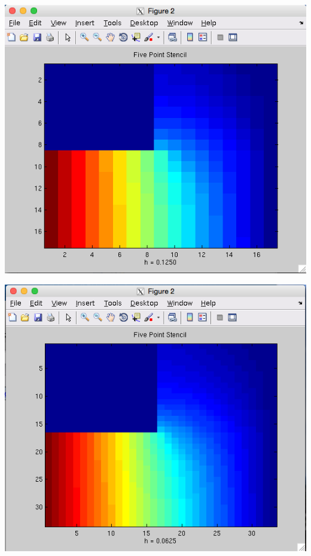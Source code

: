 \documentclass[11pt, oneside]{article}   	%
\begin{document}
\centerline{\includegraphics[scale = 0.55]{FivePoint_h3.png}}

\centerline{\includegraphics[scale = 0.55]{FivePoint_h4.png}}
\end{document}
